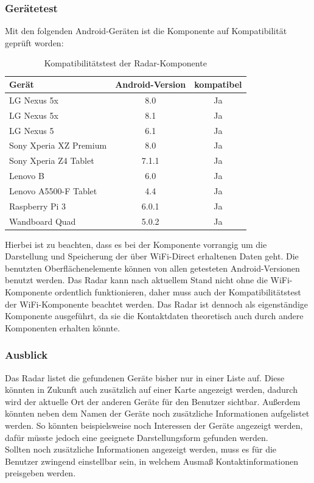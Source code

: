 \subsubsection{Gerätetest}
Mit den folgenden Android-Geräten ist die Komponente auf Kompatibilität geprüft worden:\\
\begin{table}[H]
	\begin{center}
		\begin{tabular}{l|c|c} 			
			Gerät & Android-Version & kompatibel \\
			\hline
			LG Nexus 5x & 8.0 & Ja\\
			LG Nexus 5x & 8.1 & Ja\\
			LG Nexus 5 & 6.1 & Ja\\
			Sony Xperia XZ Premium & 8.0 & Ja\\
			Sony Xperia Z4 Tablet & 7.1.1 & Ja\\
			Lenovo B & 6.0 & Ja\\
			Lenovo A5500-F Tablet & 4.4 & Ja\\
			Raspberry Pi 3 & 6.0.1 & Ja\\	
			Wandboard Quad & 5.0.2 & Ja\\			
		\end{tabular}
		\caption{Kompatibilitätstest der Radar-Komponente}
		\label{tab:dimensions}
	\end{center}
\end{table}
Hierbei ist zu beachten, dass es bei der Komponente vorrangig um die Darstellung und Speicherung der über WiFi-Direct erhaltenen Daten geht. Die benutzten Ober\-flä\-chen\-ele\-mente können von allen getesteten Android-Versionen benutzt werden. Das Radar kann nach aktuellem Stand nicht ohne die WiFi-Komponente ordentlich funktionieren, daher muss auch der Kompatibilitätstest der WiFi-Komponente beachtet werden. Das Radar ist dennoch als eigenständige Komponente ausgeführt, da sie die Kontaktdaten theoretisch auch durch andere Komponenten erhalten könnte.  
\subsubsection{Ausblick}
Das Radar listet die gefundenen Geräte bisher nur in einer Liste auf. Diese könnten in Zukunft auch zusätzlich auf einer Karte angezeigt werden, dadurch wird der aktuelle Ort der anderen Geräte für den Benutzer sichtbar. Außerdem könnten neben dem Namen der Geräte noch zusätzliche Informationen aufgelistet werden. So könnten beispielsweise noch Interessen der Geräte angezeigt werden, dafür müsste jedoch eine geeignete Darstellungsform gefunden werden.
\\Sollten noch zusätzliche Informationen angezeigt werden, muss es für die Benutzer zwingend einstellbar sein, in welchem Ausmaß Kontaktinformationen preisgeben werden.  
\newpage